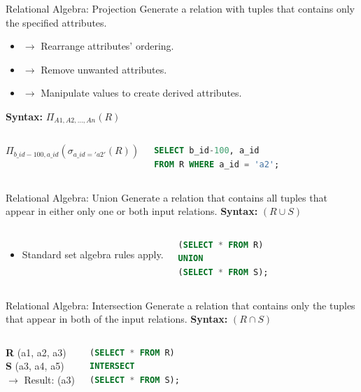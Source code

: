 \documentclass[aspectratio=169, 10pt]{beamer}
\begin{document}
\begin{frame}[fragile]{Relational Algebra: Projection}
    Generate a relation with tuples that contains only the specified attributes.
    \begin{itemize}
        \item $\rightarrow$ Rearrange attributes’ ordering.
        \item $\rightarrow$ Remove unwanted attributes.
        \item $\rightarrow$ Manipulate values to create derived attributes.
    \end{itemize}
    \vspace{1em}
    \textbf{Syntax:} $\Pi_{A1,A2,\dots,An}(R)$
    \vspace{1em}
    \begin{columns}
        $\Pi_{b\_id-100,a\_id}(\sigma_{a\_id='a2'}(R))$
        \begin{lstlisting}[language=SQL]
SELECT b_id-100, a_id
FROM R WHERE a_id = 'a2';
        \end{lstlisting}
    \end{columns}
\end{frame}

\begin{frame}[fragile]{Relational Algebra: Union}
    Generate a relation that contains all tuples that appear in either only one or both input relations.
    \vspace{1em}
    \textbf{Syntax:} $(R \cup S)$
    \vspace{1em}
    \begin{columns}
        \begin{itemize}
            \item Standard set algebra rules apply.
        \end{itemize}
        \begin{lstlisting}[language=SQL]
(SELECT * FROM R)
UNION
(SELECT * FROM S);
        \end{lstlisting}
    \end{columns}
\end{frame}

\begin{frame}[fragile]{Relational Algebra: Intersection}
    Generate a relation that contains only the tuples that appear in both of the input relations.
    \vspace{1em}
    \textbf{Syntax:} $(R \cap S)$
    \vspace{1em}
    \begin{columns}
        \textbf{R} (a1, a2, a3) \\ \textbf{S} (a3, a4, a5) \\
        $\rightarrow$ Result: (a3)
        \begin{lstlisting}[language=SQL]
(SELECT * FROM R)
INTERSECT
(SELECT * FROM S);
        \end{lstlisting}
    \end{columns}
\end{frame}
\end{document}
